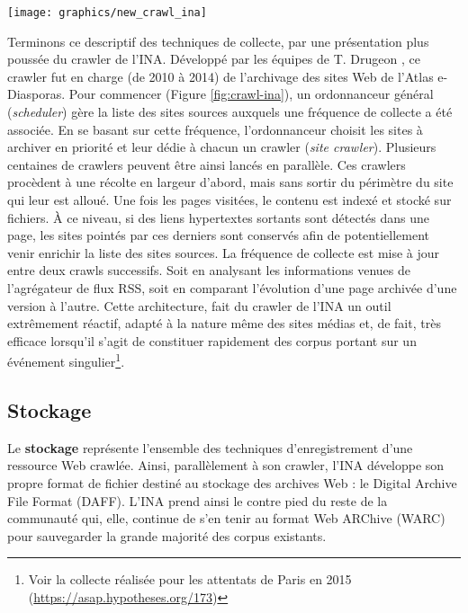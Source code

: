 \documentclass[symmetric,justified,marginals=raggedouter]{tufte-book}
\begin{document}
\begin{figure*}%
  \texttt{[image: graphics/new\_crawl\_ina]}
  \caption{Fonctionnement général du système de collecte de l'INA}
  \label{fig:crawl-ina}
\end{figure*}

\noindent Terminons ce descriptif des techniques de collecte, par une présentation plus poussée du crawler de l'INA. Développé par les équipes de T. Drugeon \citep{drugeon_technical_2005}, ce crawler fut en charge (de 2010 à 2014) de l'archivage des sites Web de l'Atlas e-Diasporas. Pour commencer (Figure \ref{fig:crawl-ina}), un ordonnanceur général (\textit{scheduler}) gère la liste des sites sources auxquels une fréquence de collecte a été associée. En se basant sur cette fréquence, l'ordonnanceur choisit les sites à archiver en priorité et leur dédie à chacun un crawler (\textit{site crawler}). Plusieurs centaines de crawlers peuvent être ainsi lancés en parallèle. Ces crawlers procèdent à une récolte en largeur d'abord, mais sans sortir du périmètre du site qui leur est alloué. Une fois les pages visitées, le contenu est indexé et stocké sur fichiers. À ce niveau, si des liens hypertextes sortants sont détectés dans une page, les sites pointés par ces derniers sont conservés afin de potentiellement venir enrichir la liste des sites sources. La fréquence de collecte est mise à jour entre deux crawls successifs. Soit en analysant les informations venues de l'agrégateur de flux RSS, soit en comparant l'évolution d'une page archivée d'une version à l'autre. Cette architecture, fait du crawler de l'INA un outil extrêmement réactif, adapté à la nature même des sites médias et, de fait, très efficace lorsqu'il s'agit de constituer rapidement des corpus portant sur un événement singulier\footnote{Voir la collecte réalisée pour les attentats de Paris en 2015 (\url{https://asap.hypotheses.org/173})}.

\subsection{Stockage}

\noindent Le \textbf{stockage} représente l'ensemble des techniques d'enregistrement d'une ressource Web crawlée. Ainsi, parallèlement à son crawler, l'INA développe son propre format de fichier destiné au stockage des archives Web : le Digital Archive File Format (DAFF). L'INA prend ainsi le contre pied du reste de la communauté qui, elle, continue de s'en tenir au format Web ARChive (WARC) pour sauvegarder la grande majorité des corpus existants.
\end{document}
